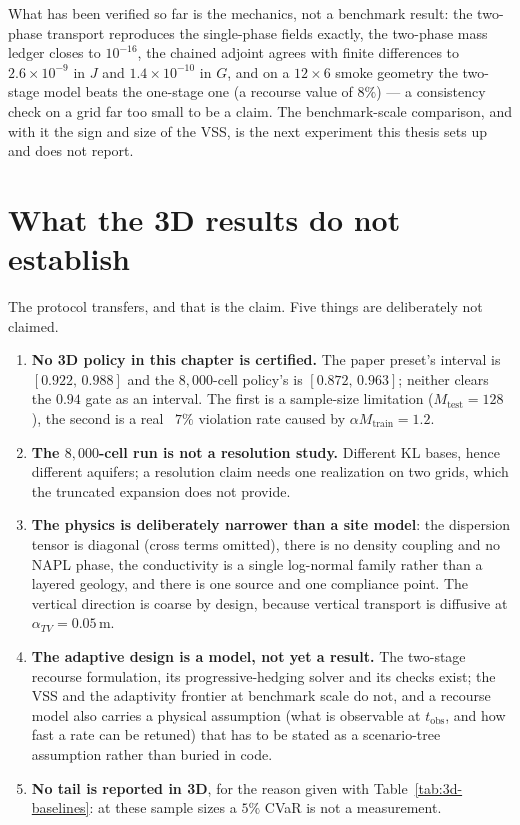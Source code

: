 What has been verified so far is the mechanics, not a benchmark result: the
two-phase transport reproduces the single-phase fields exactly, the two-phase mass
ledger closes to $10^{-16}$, the chained adjoint agrees with finite differences
to $2.6\times10^{-9}$ in $J$ and $1.4\times10^{-10}$ in $G$, and on a
$12\times6$ smoke geometry the two-stage model beats the one-stage one (a
recourse value of $8\%$) --- a consistency check on a grid far too small to be a
claim. The benchmark-scale comparison, and with it the sign and size of the
VSS, is the next experiment this thesis sets up and does not report.

\section{What the 3D results do not establish}
\label{sec:3d-not}

The protocol transfers, and that is the claim. Five things are deliberately not
claimed.

\begin{enumerate}
  \item \textbf{No 3D policy in this chapter is certified.} The paper preset's
    interval is $[0.922,\,0.988]$ and the $8{,}000$-cell policy's is
    $[0.872,\,0.963]$; neither clears the $0.94$ gate as an interval. The first
    is a sample-size limitation ($M_{\text{test}}=128$), the second is a real
    ~$7\%$ violation rate caused by $\alpha M_{\text{train}}=1.2$.
  \item \textbf{The $8{,}000$-cell run is not a resolution study.} Different KL
    bases, hence different aquifers; a resolution claim needs one realization on
    two grids, which the truncated expansion does not provide.
  \item \textbf{The physics is deliberately narrower than a site model}: the
    dispersion tensor is diagonal (cross terms omitted), there is no density
    coupling and no NAPL phase, the conductivity is a single log-normal family
    rather than a layered geology, and there is one source and one compliance
    point. The vertical direction is coarse by design, because vertical
    transport is diffusive at $\alpha_{TV}=0.05$\,m.
  \item \textbf{The adaptive design is a model, not yet a result.} The two-stage
    recourse formulation, its progressive-hedging solver and its checks exist;
    the VSS and the adaptivity frontier at benchmark scale do not, and a recourse
    model also carries a physical assumption (what is observable at
    $t_{\text{obs}}$, and how fast a rate can be retuned) that has to be stated
    as a scenario-tree assumption rather than buried in code.
  \item \textbf{No tail is reported in 3D}, for the reason given with
    Table~\ref{tab:3d-baselines}: at these sample sizes a $5\%$ CVaR is not a
    measurement.
\end{enumerate}

